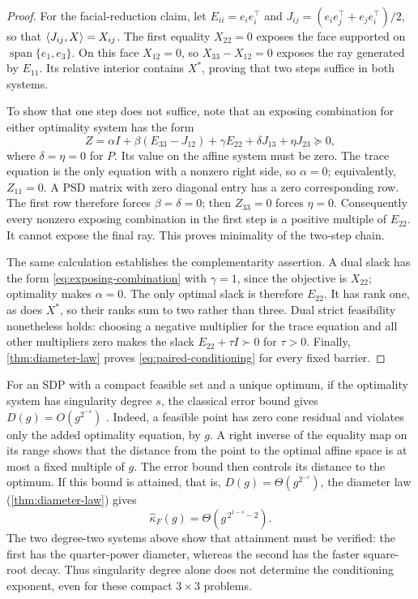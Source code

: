 \begin{proof}
For the facial-reduction claim, let
$E_{ii}=e_ie_i^\top$ and
$J_{ij}=(e_ie_j^\top+e_je_i^\top)/2$, so that
$\left\langle J_{ij},X\right\rangle=X_{ij}$. The first equality $X_{22}=0$
exposes the face supported on $\operatorname{span}\{e_1,e_3\}$.
On this face $X_{12}=0$, so $X_{33}-X_{12}=0$ exposes the ray
generated by $E_{11}$. Its relative interior contains $X^*$, proving
that two steps suffice in both systems.

To show that one step does not suffice, note that an exposing
combination for either optimality system has the form
\begin{equation}
 Z=\alpha I+\beta(E_{33}-J_{12})+\gamma E_{22}
       +\delta J_{13}+\eta J_{23}\succeq0,
 \label{eq:exposing-combination}
\end{equation}
where $\delta=\eta=0$ for $P$. Its value on the affine system
must be zero. The trace equation is the only equation with a nonzero
right side, so $\alpha=0$; equivalently, $Z_{11}=0$.
A PSD matrix with zero diagonal entry has a zero corresponding row.
The first row therefore forces $\beta=\delta=0$; then
$Z_{33}=0$ forces $\eta=0$. Consequently every nonzero exposing
combination in the first step is a positive multiple of $E_{22}$. It cannot expose
the final ray. This proves minimality of the two-step chain.

The same calculation establishes the complementarity assertion.
A dual slack has the form \eqref{eq:exposing-combination} with
$\gamma=1$, since the objective is $X_{22}$; optimality makes
$\alpha=0$. The only optimal slack is therefore $E_{22}$.
It has rank one, as does $X^*$, so their ranks sum to two rather
than three. Dual strict feasibility nonetheless holds: choosing a
negative multiplier for the trace equation and all other multipliers
zero makes the slack $E_{22}+\tau I\succ0$ for $\tau>0$.
Finally, \cref{thm:diameter-law} proves
\eqref{eq:paired-conditioning} for every fixed barrier.
\end{proof}

For an SDP with a compact feasible set and a unique optimum, if the
optimality system has singularity degree $s$, the classical error bound
gives $D(g)=O(g^{2^{-s}})$ \citep{sturm2000,drusvyatskiy2017}.
Indeed, a feasible point has zero cone residual and violates only the
added optimality equation, by $g$. A right inverse of the equality map
on its range shows that the distance from the point to the optimal
affine space is at most a fixed multiple of $g$. The error bound then controls
its distance to the optimum. If this bound is attained, that is,
$D(g)=\Theta(g^{2^{-s}})$, the diameter law (\cref{thm:diameter-law})
gives
\begin{equation}
 \widehat\kappa_F(g)=\Theta(g^{\,2^{1-s}-2}).
 \label{eq:attained-singularity-rate}
\end{equation}
The two degree-two systems above show that attainment must be
verified: the first has the quarter-power diameter, whereas the second has the
faster square-root decay. Thus singularity degree alone does not
determine the conditioning exponent, even for these compact $3\times3$
problems.

